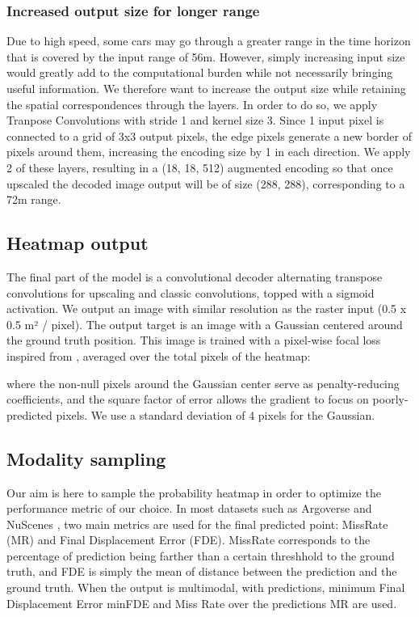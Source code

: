 \documentclass[letterpaper, 10 pt, conference]{ieeeconf}
\begin{document}
\subsubsection{Increased output size for longer range}
Due to high speed, some cars may go through a greater range in the time horizon  that is covered by the input range of 56m. However, simply increasing input size would greatly add to the computational burden while not necessarily bringing useful information. We therefore want to increase the output size while retaining the spatial correspondences through the layers. In order to do so, we apply Tranpose Convolutions with stride 1 and kernel size 3. Since 1 input pixel is connected to a grid of 3x3 output pixels, the edge pixels generate a new border of pixels around them, increasing the encoding size by 1 in each direction. We apply 2 of these layers, resulting in a (18, 18, 512) augmented encoding so that once upscaled the decoded image output will be of size (288, 288), corresponding to a 72m range.


\subsection{Heatmap output}

The final part of the model is a convolutional decoder alternating transpose convolutions for upscaling and classic convolutions, topped with a sigmoid activation. We output an image  with similar resolution as the raster input (0.5 x 0.5 m² / pixel). The output target is an image  with a Gaussian centered around the ground truth position. This image is trained with a pixel-wise focal loss inspired from \cite{zhou2019objects}, averaged over the total  pixels  of the heatmap:



where the non-null pixels around the Gaussian center serve as penalty-reducing coefficients, and the square factor of error allows the gradient to focus on poorly-predicted pixels. We use a standard deviation of 4 pixels for the Gaussian.




\subsection{Modality sampling}

Our aim is here to sample the probability heatmap in order to optimize the performance metric of our choice. In most datasets such as Argoverse \cite{chang2019argoverse} and NuScenes \cite{caesar2020nuscenes}, two main metrics are used for the final predicted point: MissRate (MR) and Final Displacement Error (FDE). MissRate corresponds to the percentage of prediction being farther than a certain threshhold to the ground truth, and FDE is simply the mean of  distance between the prediction and the ground truth.
When the output is multimodal, with  predictions, minimum Final Displacement Error minFDE and Miss Rate over the  predictions MR are used.
\end{document}
